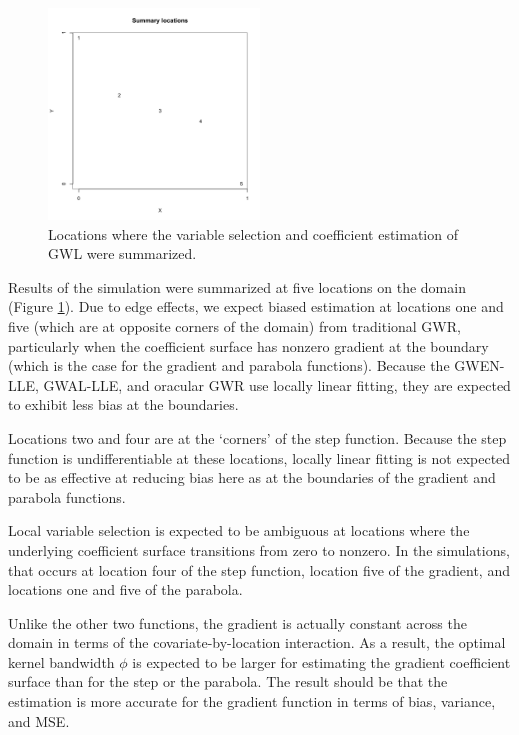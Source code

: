 \documentclass[authoryear, review, 11pt]{elsarticle}
\begin{document}
	\begin{figure}
		\begin{center}
			\includegraphics[width=0.5\textwidth]{../../figures/simulation/summary-locations.pdf}
			\caption{Locations where the variable selection and coefficient estimation of GWL were summarized.\label{fig:summary-locations}}
		\end{center}
	\end{figure}
	
	Results of the simulation were summarized at five locations on the domain (Figure \ref{fig:summary-locations}). Due to edge effects, we expect biased estimation at locations one and five (which are at opposite corners of the domain) from traditional GWR, particularly when the coefficient surface has nonzero gradient at the boundary (which is the case for the gradient and parabola functions). Because the GWEN-LLE, GWAL-LLE, and oracular GWR use locally linear fitting, they are expected to exhibit less bias at the boundaries.
	
	Locations two and four are at the `corners' of the step function. Because the step function is undifferentiable at these locations, locally linear fitting is not expected to be as effective at reducing bias here as at the boundaries of the gradient and parabola functions.
	
	Local variable selection is expected to be ambiguous at locations where the underlying coefficient surface transitions from zero to nonzero. In the simulations, that occurs at location four of the step function, location five of the gradient, and locations one and five of the parabola.
	
	Unlike the other two functions, the gradient is actually constant across the domain in terms of the covariate-by-location interaction. As a result, the optimal kernel bandwidth $\phi$ is expected to be larger for estimating the gradient coefficient surface than for the step or the parabola. The result should be that the estimation is more accurate for the gradient function in terms of bias, variance, and MSE.
		
\end{document}
